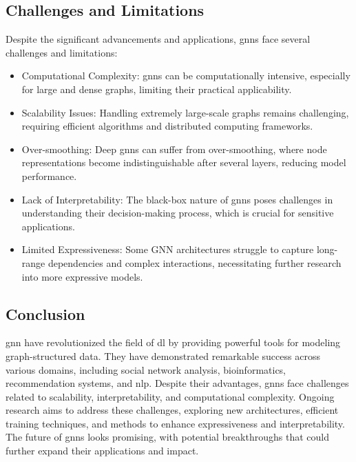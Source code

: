\subsection*{Challenges and Limitations}

Despite the significant advancements and applications, \glspl{gnn} face several challenges and limitations:
\begin{itemize}
    \item Computational Complexity: \glspl{gnn} can be computationally intensive, especially for large and dense graphs, limiting their practical applicability.
    \item Scalability Issues: Handling extremely large-scale graphs remains challenging, requiring efficient algorithms and distributed computing frameworks.
    \item Over-smoothing: Deep \glspl{gnn} can suffer from over-smoothing, where node representations become indistinguishable after several layers, reducing model performance.
    \item Lack of Interpretability: The black-box nature of \glspl{gnn} poses challenges in understanding their decision-making process, which is crucial for sensitive applications.
    \item Limited Expressiveness: Some GNN architectures struggle to capture long-range dependencies and complex interactions, necessitating further research into more expressive models.
\end{itemize}

\subsection*{Conclusion}

\acrlong{gnn} have revolutionized the field of \acrlong{dl} by providing powerful tools for modeling graph-structured data. They have demonstrated remarkable success across various domains, including social network analysis, bioinformatics, recommendation systems, and \gls{nlp}. Despite their advantages, \glspl{gnn} face challenges related to scalability, interpretability, and computational complexity. Ongoing research aims to address these challenges, exploring new architectures, efficient training techniques, and methods to enhance expressiveness and interpretability. The future of \glspl{gnn} looks promising, with potential breakthroughs that could further expand their applications and impact.
